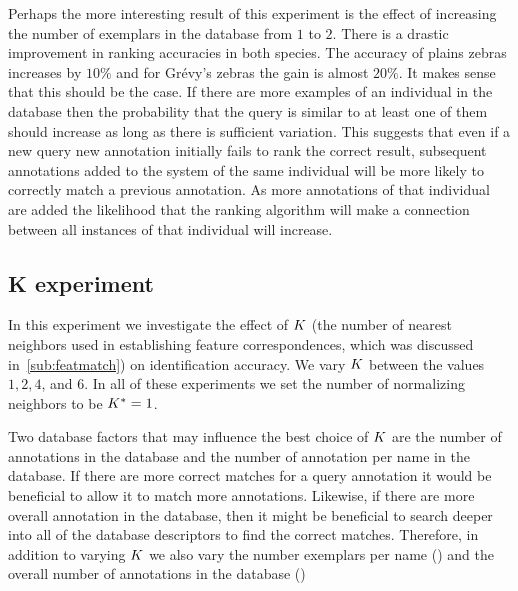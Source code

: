         Perhaps the more interesting result of this experiment is the effect of increasing the number of
          exemplars in the database from $1$ to $2$.
        There is a drastic improvement in ranking accuracies in both species.
        The accuracy of plains zebras increases by $10\percent$ and for Grévy's zebras the gain is almost
          $20\percent$.
        It makes sense that this should be the case.
        If there are more examples of an individual in the database then the probability that the query is
          similar to at least one of them should increase as long as there is sufficient variation.
        This suggests that even if a new query new annotation initially fails to rank the correct result,
          subsequent annotations added to the system of the same individual will be more likely to correctly match
          a previous annotation.
        As more annotations of that individual are added the likelihood that the ranking algorithm will make a
          connection between all instances of that individual will increase.


    \subsection{K experiment}\label{sub:exptk}  

        In this experiment we investigate the effect of $K$ (the number of nearest neighbors used in
          establishing feature correspondences, which was discussed in~\cref{sub:featmatch}) on identification
          accuracy.
        We vary $K$ between the values $1, 2, 4$, and $6$.
        In all of these experiments we set the number of normalizing neighbors to be $K^{*}=1$.

        \KExptA{}
        \KExptB{}

        Two database factors that may influence the best choice of $K$ are the number of annotations in the
          database and the number of annotation per name in the database.
        If there are more correct matches for a query annotation it would be beneficial to allow it to match more
          annotations.
        Likewise, if there are more overall annotation in the database, then it might be beneficial to search
          deeper into all of the database descriptors to find the correct matches.
        Therefore, in addition to varying $K$ we also vary the number exemplars per name () and
          the overall number of annotations in the database ()

